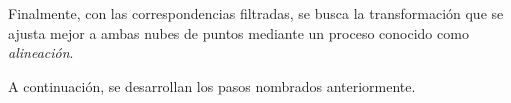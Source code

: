 Finalmente, con las correspondencias filtradas, se busca la transformación que se ajusta mejor a ambas nubes de puntos mediante un proceso conocido como \textit{alineación}.




A continuación, se desarrollan los pasos nombrados anteriormente.

